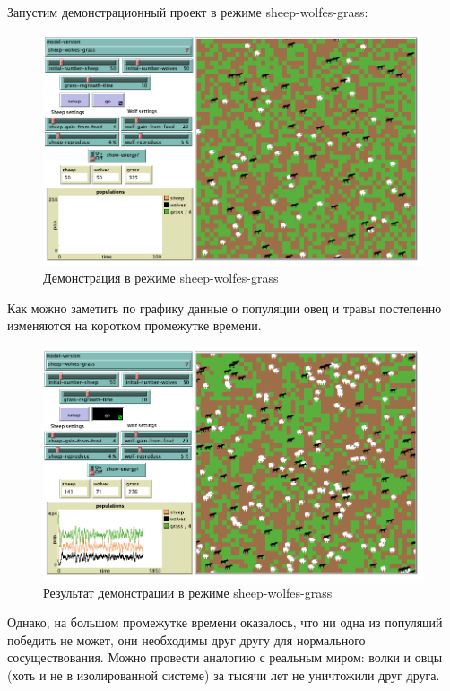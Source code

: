 \documentclass[14pt,a4paper,report]{report}
\begin{document}
Запустим демонстрационный проект в режиме sheep-wolfes-grass:

\begin{figure}[h!]
	\centering
	\includegraphics[scale = 0.68]{images/6.png}
	\caption{Демонстрация в режиме sheep-wolfes-grass}
\end{figure}

Как можно заметить по графику данные о популяции овец и травы постепенно изменяются на коротком промежутке времени.

\clearpage

\begin{figure}[h!]
	\centering
	\includegraphics[scale = 0.63]{images/7.png}
	\caption{Результат демонстрации в режиме sheep-wolfes-grass}
\end{figure}

Однако, на большом промежутке времени оказалось, что ни одна из популяций победить не может, они необходимы друг другу для нормального сосуществования. Можно провести аналогию с реальным миром: волки и овцы (хоть и не в изолированной системе) за тысячи лет не уничтожили друг друга.
\clearpage
\end{document}

